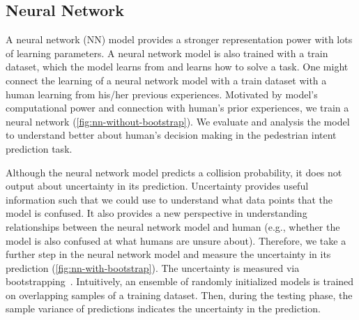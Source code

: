 \subsection{Neural Network}\label{sec:neural-network}
A neural network (NN) model provides a stronger representation power with lots of learning parameters. 
A neural network model is also trained with a train dataset, which the model learns from and learns how to solve a task. 
One might connect the learning of a neural network model with a train dataset with a human learning from his/her previous experiences. 
Motivated by model's computational power and connection with human's prior experiences, we train a neural network (\cref{fig:nn-without-bootstrap}). We evaluate and analysis the model to understand better about human's decision making in the pedestrian intent prediction task.

Although the neural network model predicts a collision probability, it does not output about uncertainty in its prediction.
Uncertainty provides useful information such that we could use to understand what data points that the model is confused. It also provides a new perspective in understanding relationships between the neural network model and human (e.g., whether the model is also confused at what humans are unsure about). 
Therefore, we take a further step in the neural network model and measure the uncertainty in its prediction (\cref{fig:nn-with-bootstrap}). 
The uncertainty is measured via bootstrapping~\cite{Osband2016, Lakshmi2016}. 
Intuitively, an ensemble of randomly initialized models is trained on overlapping samples of a training dataset. 
Then, during the testing phase, the sample variance of predictions indicates the uncertainty in the prediction. 

